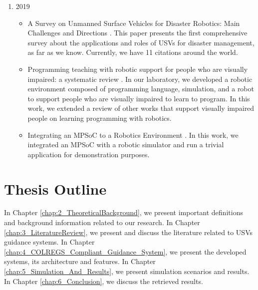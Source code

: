     \begin{enumerate}
        \item 2019
            \begin{itemize}
                \item A Survey on Unmanned Surface Vehicles for Disaster Robotics: Main Challenges and Directions \cite{Jorge2019Survey}. This paper presents the first comprehensive survey about the applications and roles of \acp{USV} for disaster management, as far as we know. Currently, we have 11 citations around the world.
                \item Programming teaching with robotic support for people who are visually impaired: a systematic review \cite{Damasio2019Programming}. In our laboratory, we developed a robotic environment composed of programming language, simulation, and a robot to support people who are visually impaired to learn to program. In this work, we extended a review of other works that support visually impaired people on learning programming with robotics.
                \item Integrating an MPSoC to a Robotics Environment \cite{Domingues2019Integrating}. In this work, we integrated an MPSoC with a robotic simulator and run a trivial application for demonstration purposes.
            \end{itemize}
    \end{enumerate}
    
    \section{Thesis Outline}
    
    In Chapter \ref{chap:2_TheoreticalBackground}, we present important definitions and background information related to our research. In Chapter \ref{chap:3_LiteratureReview}, we present and discuss the literature related to \acp{USV} guidance systems. 
    In Chapter \ref{chap:4_COLREGS_Compliant_Guidance_System}, we present the developed systems, its architecture and features. In Chapter \ref{chap:5_Simulation_And_Results}, we present simulation scenarios and results. In Chapter \ref{chap:6_Conclusion}, we discuss the retrieved results.
    